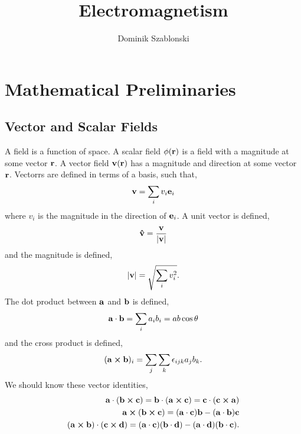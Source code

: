 \documentclass{book}
\title{Electromagnetism}
\author{Dominik Szablonski}
\begin{document}
\maketitle

\tableofcontents

\chapter{Mathematical Preliminaries}
\section{Vector and Scalar Fields}
A field is a function of space. A scalar field $\phi(\vb{r})$ is a field with a magnitude at some vector $\vb{r}$. A vector field $\vb{v}(\vb{r})$ has a magnitude and direction at some vector $\vb{r}$. Vectorrs are defined in terms of a basis, such that,
\begin{equation}
	\vb{v} = \sum_i v_i \vb{e}_i
\end{equation}
where $v_i$ is the magnitude in the direction of $\vb{e}_i$. A unit vector is defined,
\begin{equation}
	\vu{v} = \frac{\vb{v}}{|\vb{v}|}
\end{equation}
and the magnitude is defined,
\begin{equation}
	|\vb{v}| = \sqrt{\sum_i v_i^2}.
\end{equation}
The dot product between $\vb{a}$ and $\vb{b}$ is defined,
\begin{equation}
	\vb{a} \cdot \vb{b} = \sum_i a_ib_i = ab\cos\theta
\end{equation}
and the cross product is defined,
\begin{equation}
	(\vb{a}\cross\vb{b})_i = \sum_j\sum_k\epsilon_{ijk}a_jb_k.
\end{equation}
We should know these vector identities,
\begin{align}
	\vb{a}\cdot(\vb{b}\cross\vb{c}) = \vb{b}\cdot(\vb{a}\cross\vb{c}) = \vb{c}\cdot(\vb{c}\cross\vb{a}) \\
	\vb{a}\cross(\vb{b}\cross\vb{c}) = (\vb{a}\cdot\vb{c})\vb{b} - (\vb{a}\cdot\vb{b})\vb{c} \\
	(\vb{a}\cross\vb{b})\cdot(\vb{c}\cross\vb{d}) = (\vb{a}\cdot\vb{c})(\vb{b}\cdot\vb{d})-(\vb{a}\cdot\vb{d})(\vb{b}\cdot\vb{c}).
\end{align}
\end{document}
